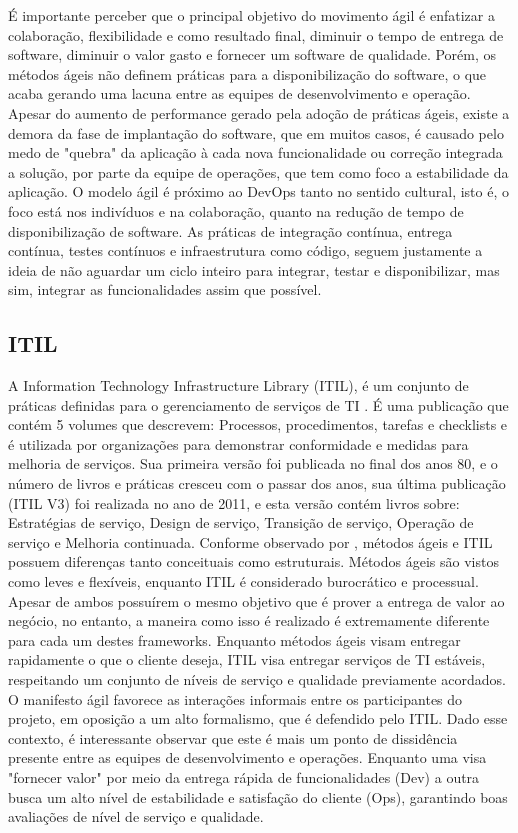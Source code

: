 \documentclass[twoside,english,brazilian]{UNISINOSartigo}
\begin{document}
É importante perceber que o principal objetivo do movimento ágil é enfatizar a colaboração, flexibilidade e como resultado final, diminuir o tempo de entrega de software, diminuir o valor gasto e fornecer um software de qualidade. Porém, os métodos ágeis não definem práticas para a disponibilização do software, o que acaba gerando uma lacuna entre as equipes de desenvolvimento e operação. Apesar do aumento de performance gerado pela adoção de práticas ágeis, existe a demora da fase de implantação do software, que em muitos casos, é causado pelo medo de "quebra" da aplicação à cada nova funcionalidade ou correção integrada a solução, por parte da equipe de operações, que tem como foco a estabilidade da aplicação.
O modelo ágil é próximo ao DevOps tanto no sentido cultural, isto é, o foco está nos indivíduos e na colaboração, quanto na redução de tempo de disponibilização de software. As práticas de integração contínua, entrega contínua, testes contínuos e  infraestrutura como código, seguem justamente a ideia de não aguardar um ciclo inteiro para integrar, testar e disponibilizar, mas sim, integrar as funcionalidades assim que possível.

\subsection{ITIL}
A Information Technology Infrastructure Library (ITIL), é um conjunto de práticas definidas para o gerenciamento de serviços de TI . É uma publicação que contém 5 volumes que descrevem: Processos, procedimentos, tarefas e checklists e é utilizada por organizações para demonstrar conformidade e  medidas para melhoria de serviços.  \newline
Sua primeira versão foi publicada no final dos anos 80, e o número de livros e práticas cresceu com o passar dos anos, sua última publicação (ITIL V3) foi realizada no ano de 2011, e esta versão contém livros sobre: Estratégias de serviço, Design de serviço, Transição de serviço, Operação de serviço e Melhoria continuada. 
Conforme observado por , métodos ágeis e ITIL possuem diferenças tanto conceituais como estruturais. Métodos ágeis são vistos como leves e flexíveis, enquanto ITIL é considerado burocrático e processual. Apesar de ambos possuírem o mesmo objetivo que é prover a entrega de valor ao negócio, no entanto, a maneira como isso é realizado é extremamente diferente para cada um destes frameworks. Enquanto métodos ágeis visam entregar rapidamente o que o cliente deseja, ITIL visa entregar serviços de TI estáveis, respeitando um conjunto de níveis de serviço e qualidade previamente acordados. O manifesto ágil favorece as interações informais entre os participantes do projeto, em oposição a um alto formalismo, que é defendido pelo ITIL.
Dado esse contexto, é interessante observar que este é mais um ponto de dissidência presente entre as equipes de desenvolvimento e operações. Enquanto uma visa "fornecer valor" por meio da entrega rápida de funcionalidades (Dev) a outra busca um alto nível de estabilidade e satisfação do cliente (Ops), garantindo boas avaliações de nível de serviço e qualidade.
\end{document}
